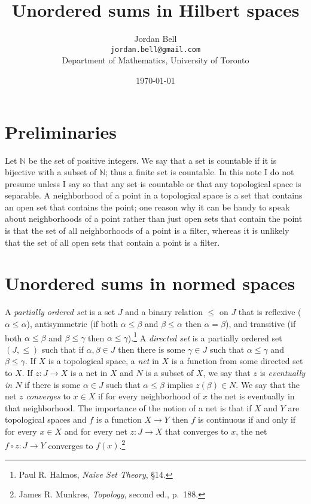 \documentclass{article}
\begin{document}
\title{Unordered sums in Hilbert spaces}
\author{Jordan Bell\\ \texttt{jordan.bell@gmail.com}\\Department of Mathematics, University of Toronto}
\date{\today}

\maketitle

\section{Preliminaries}
Let $\mathbb{N}$ be the set of positive integers. We say that a set is countable if it is bijective with a subset of
$\mathbb{N}$; thus a finite set is countable. 
In this note I do not presume unless I say so that any set is countable or that any topological space is separable. A neighborhood of a point in a topological space is a set that contains an open set that
contains the point; one reason why it can be handy to speak about neighborhoods of a point rather than just open sets that contain the point is that
the set of all neighborhoods of a point is a filter, whereas it is unlikely that the set of all open sets that contain a point is a filter.


\section{Unordered sums in normed spaces}
A {\em partially ordered set} is a set $J$ and a binary relation $\leq$ on $J$ that is reflexive ($\alpha \leq \alpha$),
antisymmetric (if both $\alpha \leq \beta$ and $\beta \leq \alpha$ then $\alpha=\beta$), and 
transitive (if both $\alpha \leq \beta$ and $\beta \leq \gamma$ then $\alpha \leq \gamma$).\footnote{Paul R. Halmos, {\em Naive Set Theory}, \S 14.}
A {\em directed set} is a partially ordered set $(J,\leq)$ such that if $\alpha,\beta \in J$ then there is some $\gamma \in J$ such that
$\alpha \leq \gamma$ and $\beta \leq \gamma$.
If $X$ is a topological space, a {\em net} in $X$ is a function from some directed set to $X$. If
$z:J \to X$ is a net in $X$ and $N$ is a subset of $X$, we say that $z$ is {\em eventually in $N$}
if there is some $\alpha \in J$ such that  $\alpha \leq \beta$ implies $z(\beta) \in N$. We say that the net $z$ {\em converges}
to $x \in X$ if for every neighborhood of $x$ the net is eventually in that neighborhood. The importance of the notion
of a net is that if $X$ and $Y$ are topological spaces and $f$ is a function $X \to Y$ then $f$ is continuous if and only if for every $x \in X$ and for every
net $z:J \to X$ that converges to $x$, the net $f \circ z:J \to Y$ converges to $f(x)$.\footnote{James R. Munkres,
{\em Topology}, second ed., p.~188.}
\end{document}
